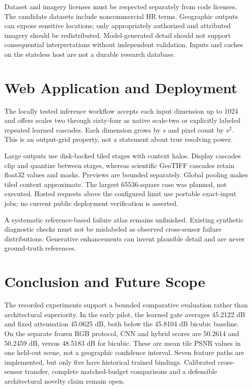 \documentclass[conference]{IEEEtran}
\begin{document}
Dataset and imagery licenses must be respected separately from code licenses. The candidate datasets include noncommercial HR terms. Geographic outputs can expose sensitive locations; only appropriately authorized and attributed imagery should be redistributed. Model-generated detail should not support consequential interpretations without independent validation. Inputs and caches on the stateless host are not a durable research database.


\section{Web Application and Deployment}
The locally tested inference workflow accepts each input dimension up to 1024 and offers scales two through sixty-four as native scale-two or explicitly labeled repeated learned cascades. Each dimension grows by $s$ and pixel count by $s^2$. This is an output-grid property, not a statement about true resolving power.

Large outputs use disk-backed tiled stages with context halos. Display cascades clip and quantize between stages, whereas scientific GeoTIFF cascades retain float32 values and masks. Previews are bounded separately. Global pooling makes tiled context approximate. The largest 65536-square case was planned, not executed. Hosted requests above the configured limit use portable exact-input jobs; no current public deployment verification is asserted.

A systematic reference-based failure atlas remains unfinished. Existing synthetic diagnostic checks must not be mislabeled as observed cross-sensor failure distributions. Generative enhancements can invent plausible detail and are never ground-truth references.


\section{Conclusion and Future Scope}
The recorded experiments support a bounded comparative evaluation rather than architectural superiority. In the early pilot, the learned gate averages 45.2122 dB and fixed attenuation 45.0625 dB, both below the 45.8104 dB bicubic baseline. On the separate frozen RGB protocol, CNN and hybrid scores are 50.2614 and 50.2459 dB, versus 48.5183 dB for bicubic. These are mean tile PSNR values in one held-out scene, not a geographic confidence interval. Seven feature paths are implemented, but only five have historical trained bindings. Calibrated cross-sensor transfer, complete matched-budget comparisons and a defensible architectural novelty claim remain open.
\end{document}

